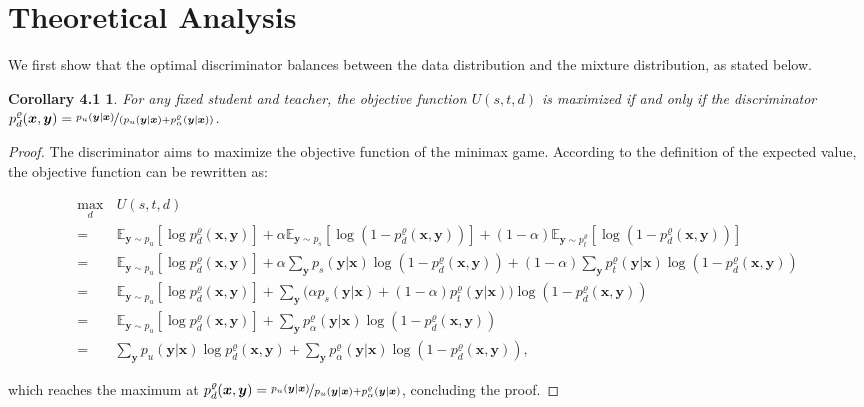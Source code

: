 \documentclass{article}
\newtheorem*{corollary1}{Corollary 4.1}
\newcommand{\OVEC}[1]{\bm{#1}} %
\newcommand{\EXP}{\mathbb{E}} %
\newcommand{\kdganfullobj}{U(s,t,d)}
\newcommand{\abbrpdat}{p_{u}}
\newcommand{\fullpdat}{p_{u}(\OVEC{y}|\OVEC{x})}
\newcommand{\abbrpstd}{p_{s}}
\newcommand{\fullpstd}[1]{p_{s}(#1|\OVEC{x})}
\newcommand{\abbrptch}{p_{t}^{\varrho}}
\newcommand{\fullptch}[1]{p_{t}^{\varrho}(#1|\OVEC{x})}
\newcommand{\fullpdis}[1]{p_{d}^{\varrho}(\OVEC{x},#1)}
\newcommand{\fullpmix}{p_{\alpha}^{\varrho}(\OVEC{y}|\OVEC{x})}
\begin{document}
\section{Theoretical Analysis} \label{app:theory}

We first show that the optimal discriminator balances between the data distribution and the mixture distribution, as stated below.
\begin{corollary1}
For any fixed student and teacher, the objective function $\kdganfullobj$ is maximized if and only if the discriminator $\fullpdis{\OVEC{y}}=\nicefrac{\fullpdat}{(\fullpdat+\fullpmix)}$.
\end{corollary1}%
\begin{proof}
The discriminator aims to maximize the objective function of the minimax game.
According to the definition of the expected value, the objective function can be rewritten as:
\begin{small}
\begin{equation*}
\begin{aligned}
\max_{d}
&
\,
\kdganfullobj
\\
=
&
\,
\EXP_{\OVEC{y}\sim\abbrpdat}[\log\fullpdis{\OVEC{y}}]
+
\alpha\EXP_{\OVEC{y}\sim\abbrpstd}[\log(1-\fullpdis{\OVEC{y}})]
+
(1-\alpha)\EXP_{\OVEC{y}\sim\abbrptch}[\log(1-\fullpdis{\OVEC{y}})]
\\
=
&
\,
\EXP_{\OVEC{y}\sim\abbrpdat}[\log\fullpdis{\OVEC{y}}]
+
\alpha\sum_{\OVEC{y}}
\fullpstd{\OVEC{y}}\log(1-\fullpdis{\OVEC{y}})
+
(1-\alpha)\sum_{\OVEC{y}}
\fullptch{\OVEC{y}}\log(1-\fullpdis{\OVEC{y}})
\\
=
&
\,
\EXP_{\OVEC{y}\sim\abbrpdat}[\log\fullpdis{\OVEC{y}}]
+
\sum_{\OVEC{y}}
\big(\alpha\fullpstd{\OVEC{y}}+(1-\alpha)\fullptch{\OVEC{y}}\big)
\log(1-\fullpdis{\OVEC{y}})
\\
=
&
\,
\EXP_{\OVEC{y}\sim\abbrpdat}[\log\fullpdis{\OVEC{y}}]
+
\sum_{\OVEC{y}}
\fullpmix\log(1-\fullpdis{\OVEC{y}})
\\
=
&
\sum_{\OVEC{y}}
\fullpdat\log\fullpdis{\OVEC{y}}
+
\sum_{\OVEC{y}}
\fullpmix\log(1-\fullpdis{\OVEC{y}})
\text{,}
\end{aligned}
\end{equation*}%
\end{small}%
which reaches the maximum at $\fullpdis{\OVEC{y}}=\nicefrac{\fullpdat}{\fullpdat+\fullpmix}$, concluding the proof.
\end{proof}
\end{document}
